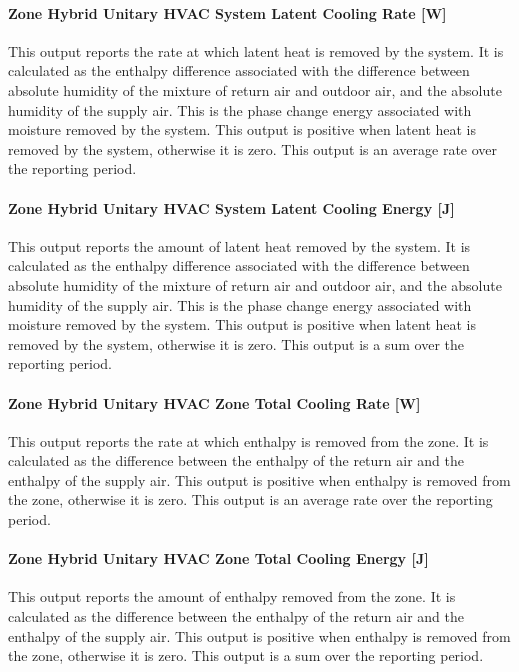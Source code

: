 \paragraph{Zone Hybrid Unitary HVAC System Latent Cooling Rate [W]}
This output reports the rate at which latent heat is removed by the system.  It is calculated as the enthalpy difference associated with the difference between absolute humidity of the mixture of return air and outdoor air, and the absolute humidity of the supply air. This is the phase change energy associated with moisture removed by the system. This output is positive when latent heat is removed by the system, otherwise it is zero.  This output is an average rate over the reporting period.

\paragraph{Zone Hybrid Unitary HVAC System Latent Cooling Energy [J]}
This output reports the amount of latent heat removed by the system.  It is calculated as the enthalpy difference associated with the difference between absolute humidity of the mixture of return air and outdoor air, and the absolute humidity of the supply air.  This is the phase change energy associated with moisture removed by the system. This output is positive when latent heat is removed by the system, otherwise it is zero. This output is a sum over the reporting period.

\paragraph{Zone Hybrid Unitary HVAC Zone Total Cooling Rate [W]}
This output reports the rate at which enthalpy is removed from the zone. It is calculated as the difference between the enthalpy of the return air and the enthalpy of the supply air. This output is positive when enthalpy is removed from the zone, otherwise it is zero. This output is an  average rate over the reporting period.

\paragraph{Zone Hybrid Unitary HVAC Zone Total Cooling Energy [J]}
This output reports the amount of enthalpy removed from the zone. It is calculated as the difference between the enthalpy of the return air and the enthalpy of the supply air. This output is positive when enthalpy is removed from the zone, otherwise it is zero. This output is a sum over the reporting period.

